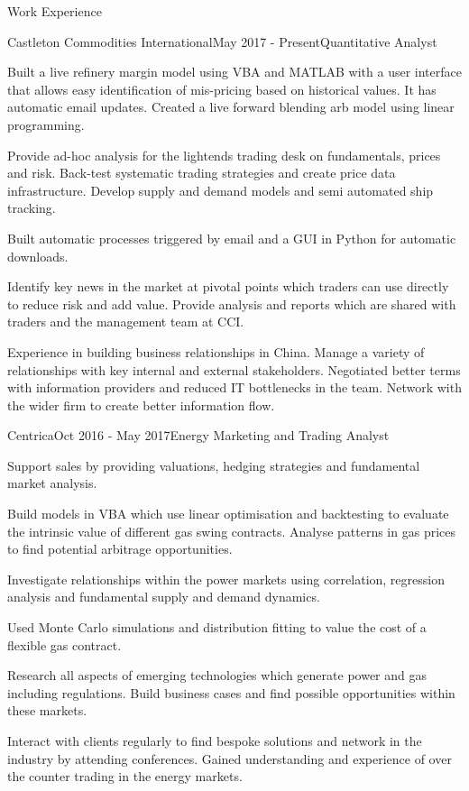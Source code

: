 \documentclass{resume} %
\begin{document}
\begin{rSection}{Work Experience}
	
	\begin{rSubsection}{Castleton Commodities International}{May 2017 - Present}{Quantitative Analyst}{}
		\item Built a live refinery margin model using VBA and MATLAB with a user interface that allows easy identification of mis-pricing based on historical values. It has automatic email updates. Created a live forward blending arb model using linear programming.
		\item Provide ad-hoc analysis for the lightends trading desk on fundamentals, prices and risk. Back-test systematic trading strategies and create price data infrastructure. Develop supply and demand models and semi automated ship tracking.
		\item Built automatic processes triggered by email and a GUI in Python for automatic downloads.
		\item Identify key news in the market at pivotal points which traders can use directly to reduce risk and add value. Provide analysis and reports which are shared with traders and the management team at CCI.
		\item Experience in building business relationships in China. Manage a variety of relationships with key internal and external stakeholders. Negotiated better terms with information providers and reduced IT bottlenecks in the team. Network with the wider firm to create better information flow. 
	\end{rSubsection}	
	\newpage
	\begin{rSubsection}{Centrica}{Oct 2016 - May 2017}{Energy Marketing and Trading Analyst}{}
		\item Support sales by providing valuations, hedging strategies and fundamental market analysis.
		\item Build models in VBA which use linear optimisation and backtesting to evaluate the intrinsic value of different gas swing contracts. Analyse patterns in gas prices to find potential arbitrage opportunities.   
		\item Investigate relationships within the power markets using correlation, regression analysis and fundamental supply and demand dynamics.
		\item Used Monte Carlo simulations and distribution fitting to value the cost of a flexible gas contract.
		\item Research all aspects of emerging technologies which generate power and gas including regulations. Build business cases and find possible opportunities within these markets. 
		\item Interact with clients regularly to find bespoke solutions and network in the industry by attending conferences.  Gained understanding and experience of over the counter trading in the energy markets.	
		

\end{rSubsection}
\end{rSection}
\end{document}

